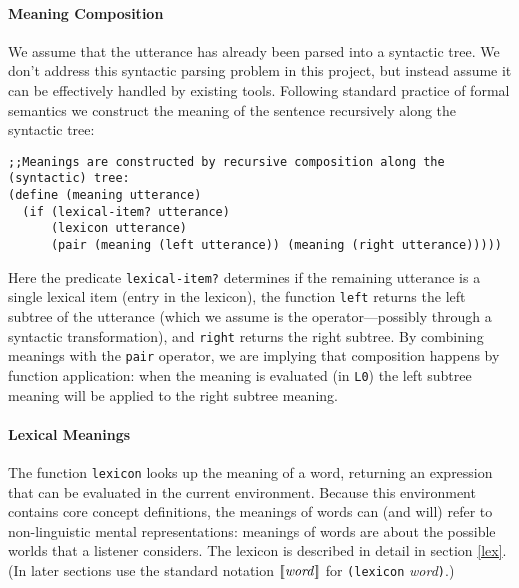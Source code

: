 \documentclass[12pt]{article}
\newcommand{\llbracket}{\ensuremath{\left [\!\left [}}%
\newcommand{\rrbracket}{\ensuremath{\right ]\!\right ]}}
\providecommand{\sv}[1]{\ensuremath{\llbracket #1 \rrbracket}}
\newcounter{definition}
\begin{document}
\paragraph{Meaning Composition}
We assume that the utterance has already been parsed into a syntactic tree. We don't address this syntactic parsing problem in this project, but instead assume it can be effectively handled by existing tools. 
Following standard practice of formal semantics \cite{heimkratzer1998} we construct the meaning of the sentence recursively along the syntactic tree:
%
%
\begin{lstlisting}
;;Meanings are constructed by recursive composition along the (syntactic) tree:
(define (meaning utterance)
  (if (lexical-item? utterance)
      (lexicon utterance)
      (pair (meaning (left utterance)) (meaning (right utterance)))))
\end{lstlisting}  
Here the predicate \lstinline{lexical-item?} determines if the remaining utterance is a single lexical item (entry in the lexicon), the function \lstinline{left} returns the left subtree of the utterance (which we assume is the operator---possibly through a syntactic transformation), and \lstinline{right} returns the right subtree. By combining meanings with the \lstinline{pair} operator, we are implying that composition happens by function application: when the meaning is evaluated (in \lstinline{L0}) the left subtree meaning will be applied to the right subtree meaning.


\paragraph{Lexical Meanings}
The function \lstinline{lexicon} looks up the meaning of a word, returning an expression that can be evaluated in the current environment. Because this environment contains core concept definitions, the meanings of words can (and will) refer to non-linguistic mental representations: meanings of words are about the possible worlds that a listener considers. The lexicon is described in detail in section \ref{lex}. 
(In later sections use the standard notation \sv{\mathit{word}} for \lstinline{(lexicon} {\it word}\lstinline{)}.)
\end{document}
